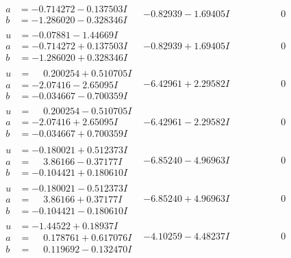 \documentclass[1p]{elsarticle_modified}
\theoremstyle{definition}
\begin{document}
$$\begin{array}{c|c|c}
\begin{aligned}
a &= -0.714272 - 0.137503 I \\
b &= -1.286020 - 0.328346 I\end{aligned}
 & -0.82939 - 1.69405 I & \phantom{-0.000000 } 0 \\ \hline\begin{aligned}
u &= -0.07881 - 1.44669 I \\
a &= -0.714272 + 0.137503 I \\
b &= -1.286020 + 0.328346 I\end{aligned}
 & -0.82939 + 1.69405 I & \phantom{-0.000000 } 0 \\ \hline\begin{aligned}
u &= \phantom{-}0.200254 + 0.510705 I \\
a &= -2.07416 - 2.65095 I \\
b &= -0.034667 - 0.700359 I\end{aligned}
 & -6.42961 + 2.29582 I & \phantom{-0.000000 } 0 \\ \hline\begin{aligned}
u &= \phantom{-}0.200254 - 0.510705 I \\
a &= -2.07416 + 2.65095 I \\
b &= -0.034667 + 0.700359 I\end{aligned}
 & -6.42961 - 2.29582 I & \phantom{-0.000000 } 0 \\ \hline\begin{aligned}
u &= -0.180021 + 0.512373 I \\
a &= \phantom{-}3.86166 - 0.37177 I \\
b &= -0.104421 + 0.180610 I\end{aligned}
 & -6.85240 - 4.96963 I & \phantom{-0.000000 } 0 \\ \hline\begin{aligned}
u &= -0.180021 - 0.512373 I \\
a &= \phantom{-}3.86166 + 0.37177 I \\
b &= -0.104421 - 0.180610 I\end{aligned}
 & -6.85240 + 4.96963 I & \phantom{-0.000000 } 0 \\ \hline\begin{aligned}
u &= -1.44522 + 0.18937 I \\
a &= \phantom{-}0.178761 + 0.617076 I \\
b &= \phantom{-}0.119692 - 0.132470 I\end{aligned}
 & -4.10259 - 4.48237 I & \phantom{-0.000000 } 0 \\ \hline\begin{aligned}

\end{aligned}
\end{array}$$
\end{document}
